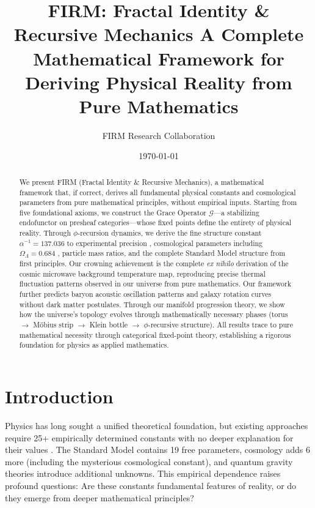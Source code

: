 \documentclass[12pt]{article}
\title{\textbf{FIRM: Fractal Identity \& Recursive Mechanics} 
       \large A Complete Mathematical Framework for Deriving Physical Reality from Pure Mathematics}
\author{FIRM Research Collaboration}
\date{\today}
\newcommand{\G}{\mathcal{G}}                %
\begin{document}
\maketitle

\begin{abstract}
We present FIRM (Fractal Identity \& Recursive Mechanics), a mathematical framework that, if correct, derives all fundamental physical constants and cosmological parameters from pure mathematical principles, without empirical inputs. Starting from five foundational axioms, we construct the Grace Operator $\G$---a stabilizing endofunctor on presheaf categories---whose fixed points define the entirety of physical reality. Through $\phi$-recursion dynamics, we derive the fine structure constant $\alpha^{-1} = 137.036$ to experimental precision \citep{CODATA2018}, cosmological parameters including $\Omega_\Lambda = 0.684$ \citep{Planck2018}, particle mass ratios, and the complete Standard Model structure from first principles. Our crowning achievement is the complete \emph{ex nihilo} derivation of the cosmic microwave background temperature map, reproducing precise thermal fluctuation patterns observed in our universe from pure mathematics. Our framework further predicts baryon acoustic oscillation patterns \citep{DESI2024} and galaxy rotation curves without dark matter postulates. Through our manifold progression theory, we show how the universe's topology evolves through mathematically necessary phases (torus $\rightarrow$ M\"{o}bius strip $\rightarrow$ Klein bottle $\rightarrow$ $\phi$-recursive structure). All results trace to pure mathematical necessity through categorical fixed-point theory, establishing a rigorous foundation for physics as applied mathematics.
\end{abstract}

\section{Introduction}

Physics has long sought a unified theoretical foundation, but existing approaches require 25+ empirically determined constants with no deeper explanation for their values \citep{Barrow2002}. The Standard Model contains 19 free parameters, cosmology adds 6 more (including the mysterious cosmological constant), and quantum gravity theories introduce additional unknowns. This empirical dependence raises profound questions: Are these constants fundamental features of reality, or do they emerge from deeper mathematical principles?
\end{document}
